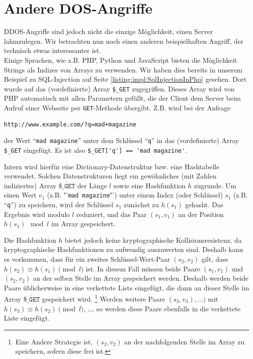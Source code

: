 \section{Andere DOS-Angriffe}

DDOS-Angriffe sind jedoch nicht die einzige Möglichkeit, einen Server lahmzulegen. Wir betrachten nun noch einen anderen beispielhaften Angriff, der technisch etwas interessanter ist.\\

Einige Sprachen, wie z.B. PHP, Python und JavaScript bieten die Möglichkeit Strings als Indizes von Arrays zu verwenden.
Wir haben dies bereits in unserem Beispiel zu SQL-Injection auf Seite \ref{listing:impl:SqlInjectionInPhp} gesehen. Dort wurde auf das (vordefinierte) Array \lstinline+$_GET+ zugegriffen. Dieses Array wird von PHP automatisch mit allen Parametern gefüllt, die der Client dem Server beim Aufruf einer Webseite per \lstinline+GET+-Methode übergibt. Z.B. wird bei der Anfrage
\begin{lstlisting}
http://www.example.com/?q=mad+magazine
\end{lstlisting}

der Wert "`\lstinline+mad magazine+"' unter dem Schlüssel "`\lstinline+q+"' in das (vordefinierte) Array \lstinline+$_GET+ eingefügt. Es ist also \lstinline+$_GET['q'] == 'mad magazine'+.

Intern wird hierfür eine Dictionary-Datenstruktur bzw. eine Hashtabelle verwendet.
Solchen Datenstrukturen liegt ein gewöhnliches (mit Zahlen indiziertes) Array $\overline{\texttt{\$\_GET}}$ der Länge $l$ sowie eine Hashfunktion $h$ zugrunde.
Um einen Wert $v_1$ (z.B. "'\lstinline+mad magazine+"') unter einem Index (oder Schlüssel) $s_1$ (z.B. "`\lstinline+q+"') zu speichern, wird der Schlüssel $s_1$ zunächst zu $h(s_1)$ gehasht.
Das Ergebnis wird modulo $l$ reduziert, und das Paar $(s_1, v_1)$ an der Position $h(s_1) \mod l$ im Array gespeichert.

Die Hashfunktion $h$ bietet jedoch keine kryptographische Kollisionsresistenz, da kryptographische Hashfunktionen zu aufwendig auszuwerten sind.
Deshalb kann es vorkommen, dass für ein zweites Schlüssel-Wert-Paar $(s_2, v_2)$ gilt, dass $h(s_2) \equiv h(s_1) \pmod l$ ist.
In diesem Fall müssen beide Paare $(s_1,v_1)$ und $(s_2,v_2)$ an der selben Stelle im Array gespeichert werden. Deshalb werden beide Paare üblicherweise in eine verkettete Liste eingefügt, die dann an dieser Stelle im Array $\overline{\texttt{\$\_GET}}$ gespeichert wird.%
\footnote{Eine Andere Strategie ist, $(s_2,v_2)$ an der nachfolgenden Stelle im Array zu speichern, sofern diese frei ist.}
Werden weitere Paare $(s_3, v_3), \ldots)$ mit $h(s_3) \equiv h(s_2) \pmod l$, \ldots, so werden diese Paare ebenfalls in die verkettete Liste eingefügt.\\

